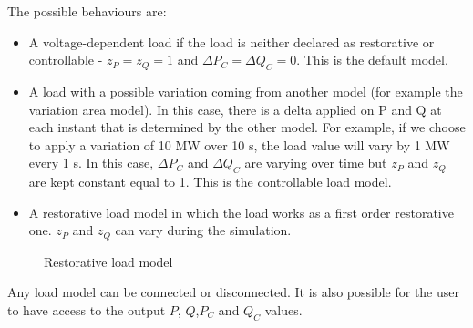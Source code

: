 \documentclass[a4paper, 12pt]{report}
\begin{document}
The possible behaviours are:
\begin{itemize}
\item A voltage-dependent load if the load is neither declared as restorative or controllable - $z_{P} = z_{Q} = 1$ and $\Delta P_{C} = \Delta Q_{C} = 0 $. This is the default model.
\item A load with a possible variation coming from another model (for example the variation area model). In this case, there is a delta applied on P and Q at each instant that is determined by the other model. For example, if we choose to apply a variation of 10 MW over 10 s, the load value will vary by 1 MW every 1 s. In this case, $\Delta P_{C}$ and $\Delta Q_{C}$ are varying over time but $z_{P}$ and $z_{Q}$ are kept constant equal to 1. This is the controllable load model.
\item A restorative load model in which the load works as a first order restorative one. $z_{P}$ and $z_{Q}$ can vary during the simulation.
\end{itemize}

\begin{figure}[h]
  \setlength{\abovecaptionskip}{15pt}
\centering
\caption{Restorative load model}
\end{figure}

Any load model can be connected or disconnected. It is also possible for the user to have access to the output $P$, $Q$,$ P_C$ and $Q_C$ values. \\
\end{document}
